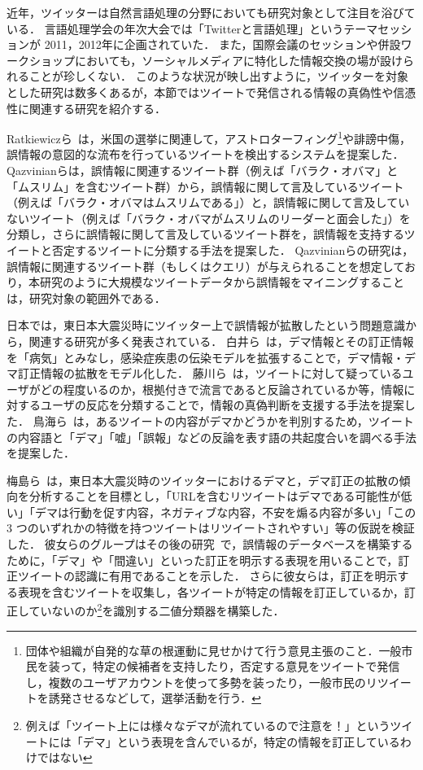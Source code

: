\documentclass[japanese]{jnlp_1.4}
\begin{document}
近年，ツイッターは自然言語処理の分野においても研究対象として注目を浴びている．
言語処理学会の年次大会では「Twitterと言語処理」というテーマセッションが
2011，2012年に企画されていた．
また，国際会議のセッションや併設ワークショップにおいても，ソーシャルメディアに特化した情報交換の場が設けられることが珍しくない．
このような状況が映し出すように，ツイッターを対象とした研究は数多くあるが，本節ではツイートで発信される情報の真偽性や信憑性に関連する研究を紹介する．

Ratkiewiczら~\cite{Ratkiewicz:2011}は，米国の選挙に関連して，アストロターフィング\footnote{団体や組織が自発的な草の根運動に見せかけて行う意見主張のこと．一般市民を装って，特定の候補者を支持したり，否定する意見をツイートで発信し，複数のユーザアカウントを使って多勢を装ったり，一般市民のリツイートを誘発させるなどして，選挙活動を行う．}や誹謗中傷，誤情報の意図的な流布を行っているツイートを検出するシステムを提案した．
Qazvinianら\cite{Qaz2011}は，誤情報に関連するツイート群（例えば「バラク・オバマ」と「ムスリム」を含むツイート群）から，誤情報に関して言及しているツイート（例えば「バラク・オバマはムスリムである」）と，誤情報に関して言及していないツイート（例えば「バラク・オバマがムスリムのリーダーと面会した」）を分類し，さらに誤情報に関して言及しているツイート群を，誤情報を支持するツイートと否定するツイートに分類する手法を提案した．
Qazvinianらの研究は，誤情報に関連するツイート群（もしくはクエリ）が与えられることを想定しており，本研究のように大規模なツイートデータから誤情報をマイニングすることは，研究対象の範囲外である．

日本では，東日本大震災時にツイッター上で誤情報が拡散したという問題意識から，関連する研究が多く発表されている．
白井ら~\cite{Shirai}は，デマ情報とその訂正情報を「病気」とみなし，感染症疾患の伝染モデルを拡張することで，デマ情報・デマ訂正情報の拡散をモデル化した．
藤川ら~\cite{Fuji12}は，ツイートに対して疑っているユーザがどの程度いるのか，根拠付きで流言であると反論されているか等，情報に対するユーザの反応を分類することで，情報の真偽判断を支援する手法を提案した．
鳥海ら~\cite{Tori}は，あるツイートの内容がデマかどうかを判別するため，ツイートの内容語と「デマ」「嘘」「誤報」などの反論を表す語の共起度合いを調べる手法を提案した．

梅島ら~\cite{Ume11}は，東日本大震災時のツイッターにおけるデマと，デマ訂正の拡散の傾向を分析することを目標とし，「URLを含むリツイートはデマである可能性が低い」「デマは行動を促す内容，ネガティブな内容，不安を煽る内容が多い」「この 3 つのいずれかの特徴を持つツイートはリツイートされやすい」等の仮説を検証した．
彼女らのグループはその後の研究~\cite{Ume12,DemaCloud}で，誤情報のデータベースを構築するために，「デマ」や「間違い」といった訂正を明示する表現を用いることで，訂正ツイートの認識に有用であることを示した．
さらに彼女らは，訂正を明示する表現を含むツイートを収集し，各ツイートが特定の情報を訂正しているか，訂正していないのか\footnote{例えば「ツイート上には様々なデマが流れているので注意を！」というツイートには「デマ」という表現を含んでいるが，特定の情報を訂正しているわけではない}を識別する二値分類器を構築した．
\end{document}
